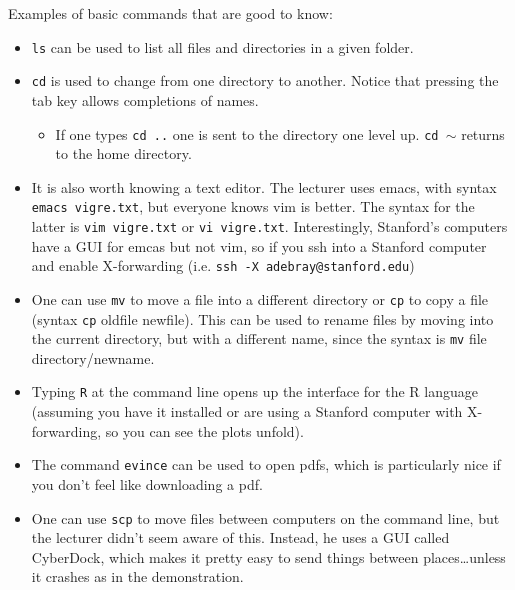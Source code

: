 %
Examples of basic commands that are good to know:
\begin{itemize}
\item \texttt{ls} can be used to list all files and directories in a given folder.
\item \texttt{cd} is used to change from one directory to another. Notice that pressing the tab key allows completions of names.
\begin{itemize}
\item If one types \texttt{cd ..} one is sent to the directory one level up. \texttt{cd $\sim$} returns to the home directory.
\end{itemize}
\item It is also worth knowing a text editor. The lecturer uses emacs, with syntax \texttt{emacs vigre.txt}, but everyone knows vim is better. The syntax for the latter is \texttt{vim vigre.txt} or \texttt{vi vigre.txt}. Interestingly, Stanford's computers have a GUI for emcas but not vim, so if you ssh into a Stanford computer and enable X-forwarding (i.e. \texttt{ssh -X adebray@stanford.edu})
\item One can use \texttt{mv} to move a file into a different directory or \texttt{cp} to copy a file (syntax \texttt{cp} oldfile newfile). This can be used to rename files by moving into the current directory, but with a different name, since the syntax is \texttt{mv} file directory/newname.
\item Typing \texttt{R} at the command line opens up the interface for the R language (assuming you have it installed or are using a Stanford computer with X-forwarding, so you can see the plots unfold).
\item The command \texttt{evince} can be used to open pdfs, which is particularly nice if you don't feel like downloading a pdf.
\item One can use \texttt{scp} to move files between computers on the command line, but the lecturer didn't seem aware of this. Instead, he uses a GUI called CyberDock, which makes it pretty easy to send things between places\dots unless it crashes as in the demonstration.
\end{itemize}
%
